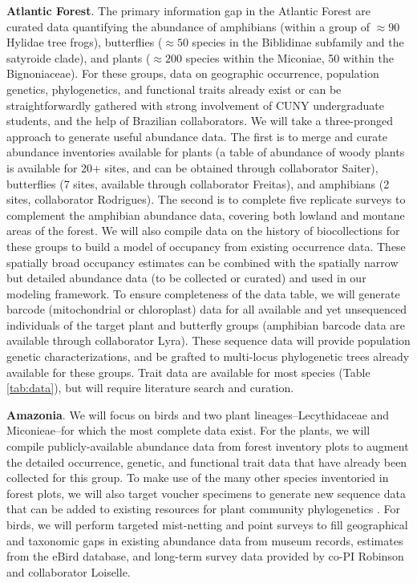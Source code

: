 \documentclass[11pt]{article}
\begin{document}
\textbf{Atlantic Forest}. The primary information gap in the Atlantic
Forest are curated data quantifying the abundance of amphibians
(within a group of $\approx 90$ Hylidae tree frogs), butterflies
($\approx 50$ species in the Biblidinae subfamily and the satyroide
clade), and plants ($\approx 200$ species within the Miconiae, 50
within the Bignoniaceae). For these groups, data on geographic
occurrence, population genetics, phylogenetics, and functional traits
already exist or can be straightforwardly gathered with strong
involvement of CUNY undergraduate students, and the help of Brazilian
collaborators.  We will take a three-pronged approach to generate
useful abundance data. The first is to merge and curate abundance
inventories available for plants (a table of abundance of woody plants
is available for 20+ sites, and can be obtained through collaborator
Saiter), butterflies (7 sites, available through collaborator
Freitas), and amphibians (2 sites, collaborator Rodrigues). The second
is to complete five replicate surveys to complement the amphibian
abundance data, covering both lowland and montane areas of the
forest. We will also compile data on the history of biocollections for
these groups to build a model of occupancy from existing occurrence
data. These spatially broad occupancy estimates can be combined with
the spatially narrow but detailed abundance data (to be collected or
curated) and used in our modeling framework. To ensure completeness of
the data table, we will generate barcode (mitochondrial or
chloroplast) data for all available and yet unsequenced individuals of
the target plant and butterfly groups (amphibian barcode data are
available through collaborator Lyra). These sequence data will provide
population genetic characterizations, and be grafted to multi-locus
phylogenetic trees already available for these groups. Trait data are
available for most species (Table \ref{tab:data}), but will require
literature search and curation.

\textbf{Amazonia}. We will focus on birds and two plant
lineages--Lecythidaceae and Miconieae--for which the most complete
data exist. For the plants, we will compile publicly-available
abundance data from forest inventory plots
\cite{Lopez-Gonzalez2011-wr, Ter_Steege2011-yr, Rainfor2018-so} to
augment the detailed occurrence, genetic, and functional trait data
that have already been collected for this group. To make use of the
many other species inventoried in forest plots, we will also target
voucher specimens to generate new sequence data that can be added to
existing resources for plant community phylogenetics
\cite{webb2008phylocom, Harmon2013-wb}.  For birds, we will perform
targeted mist-netting and point surveys to fill geographical and
taxonomic gaps in existing abundance data from museum records,
estimates from the eBird database, and long-term survey data provided
by co-PI Robinson and collaborator Loiselle.
\end{document}
